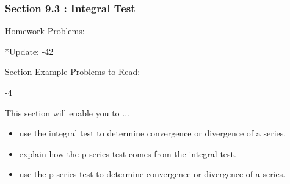 %
%

\begin{frame}
\frametitle{\Large {\color[rgb]{0.02,0.20,1.0} Section 9.3 : Integral Test}}
\vspace{0.8cm}
\scriptsize
\begin{block}{Homework Problems:}

\vspace{0.2cm}
\centering
*Update: -42
	
\end{block}
\vspace{0.5cm}

\begin{block}{Section Example Problems to Read:}

\vspace{0.2cm}
-4
	
\end{block}
\vspace{0.2cm}

\begin{block}{This section will enable you to ...}
\begin{itemize}
	\item[...] use the integral test to determine convergence or divergence of a series.
	\item[...] explain how the p-series test comes from the integral test.  
	\item[...] use the p-series test to determine convergence or divergence of a series.
\end{itemize}
\end{block}
\vspace{3.0cm}
\end{frame}

